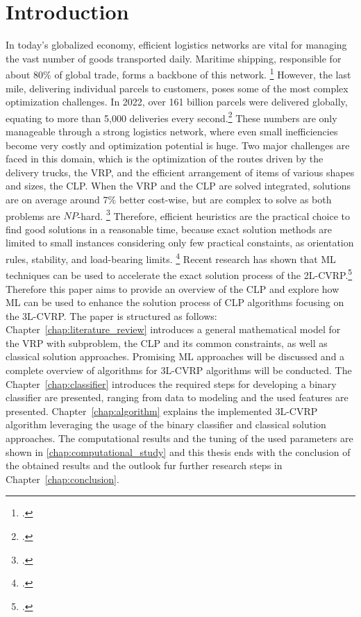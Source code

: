 \chapter{Introduction}
\label{sec:introduction}
In today’s globalized economy, efficient logistics networks are vital for managing the vast number of
goods transported daily. Maritime shipping, responsible for about $80\%$ of global trade,
forms a backbone of this network. \footcite[cf.][]{un_trade_and_development_unctad_review_2024}
However, the last mile, delivering individual parcels to customers, poses some of the most complex optimization
challenges. In 2022, over 161 billion parcels were delivered globally, equating to more than 5,000
deliveries every second.\footcite[cf.][]{statista_global_2022}
These numbers are only manageable through a strong logistics network, where even small inefficiencies
become very costly and optimization potential is huge. Two major challenges are faced in this domain, which
is the optimization of the routes driven by the delivery trucks, the \gls{VRP}, and the efficient arrangement of items
of various shapes and sizes, the \gls{CLP}. When the \gls{VRP} and the \gls{CLP} are solved integrated,
solutions are on average around $7\%$ better cost-wise, but are complex to solve as
both problems are $NP$-hard. \footcite[cf.][p. 23]{cote_value_2016} Therefore, efficient heuristics are the practical
choice to find good solutions in a reasonable time, because exact solution methods are limited to
small instances considering only few practical constaints, as orientation rules, stability, and load-bearing limits. \footcite[cf.][pp. 377--378]{bischoff_issues_1995}
Recent research has shown that \gls{ML} techniques can be used to accelerate the exact solution process
of the \gls{2L-CVRP}.\footcite[cf.][]{zhang_learning-based_2022}
Therefore this paper aims to provide an overview of the \gls{CLP} and explore how \gls{ML} can be used
to enhance the solution process of \gls{CLP} algorithms focusing on the \gls{3L-CVRP}.
The paper is structured as follows:
Chapter~\ref{chap:literature_review} introduces a general mathematical model for
the \gls{VRP} with subproblem, the \gls{CLP} and its common constraints, as well as classical
solution approaches. Promising \gls{ML} approaches will be discussed and a complete overview of algorithms
for \gls{3L-CVRP} algorithms will be conducted. The Chapter~\ref{chap:classifier} introduces the required
steps for developing a binary classifier are presented, ranging from data to modeling and the used features
are presented. Chapter~\ref{chap:algorithm} explains the implemented \gls{3L-CVRP} algorithm leveraging
the usage of the binary classifier and classical solution approaches. The computational results and the
tuning of the used parameters are shown in \ref{chap:computational_study} and this thesis ends with the conclusion
of the obtained results and the outlook fur further research steps in Chapter~\ref{chap:conclusion}.
